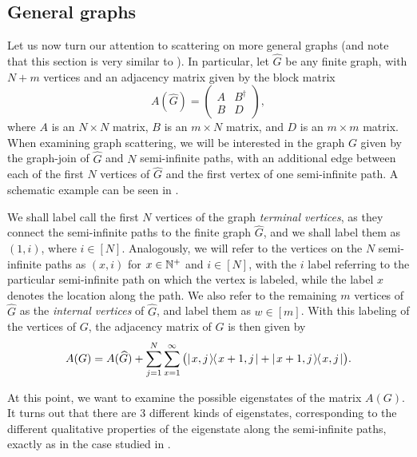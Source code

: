 \documentclass[../thesis-main/thesis-main]{subfiles}
\begin{document}
\subsection{General graphs}\label{sec:general_graphs}

Let us now turn our attention to scattering on more general graphs (and note that this section is very similar to \cite{CG12}).  In particular, let $\widehat{G}$ be any finite graph, with $N+m$ vertices and an adjacency matrix given by the block matrix
\begin{equation}
  A(\widehat{G}) = \begin{pmatrix}A & B^\dag\\ B & D\end{pmatrix},
\end{equation}
where $A$ is an $N\times N$ matrix, $B$ is an $m\times N$ matrix, and $D$ is an $m\times m$ matrix.  When examining graph scattering, we will be interested in the graph $G$ given by the graph-join of $\widehat{G}$ and $N$ semi-infinite paths, with an additional edge between each of the first $N$ vertices of $\widehat{G}$ and the first vertex of one semi-infinite path.  A schematic example can be seen in .

We shall label call the first $N$ vertices of the graph \emph{terminal vertices}, as they connect the semi-infinite paths to the finite graph $\widehat{G}$, and we shall label them as $(1,i)$, where $i\in[N]$.  Analogously, we will refer to the vertices on the $N$ semi-infinite paths as $(x,i)$ for $x\in \mathbb{N}^+$ and $i\in[N]$, with the $i$ label referring to the particular semi-infinite path on which the vertex is labeled, while the label $x$ denotes the location along the path.  We also refer to the remaining $m$ vertices of $\widehat{G}$ as the \textit{internal vertices} of $\widehat{G}$, and label them as $w\in[m]$.  With this labeling of the vertices of $G$, the adjacency matrix of $G$ is then given by
\begin{equation}
  A(G) = A(\widehat{G}) + \sum_{j=1}^N \sum_{x=1}^\infty \big(|\mspace{2mu} x,j \mspace{2mu} \rangle\mspace{-2mu}\langle\mspace{2mu} x+1,j \mspace{2mu} | + |\mspace{2mu} x+1,j \mspace{2mu} \rangle\mspace{-2mu}\langle\mspace{2mu} x,j \mspace{2mu} |\big).
\end{equation}

At this point, we want to examine the possible eigenstates of the matrix $A(G)$.  It turns out that there are 3 different kinds of eigenstates, corresponding to the different qualitative properties of the eigenstate along the semi-infinite paths, exactly as in the case studied in .
\end{document}
